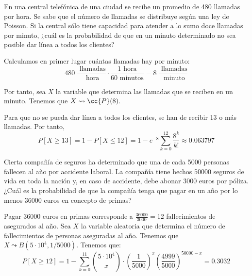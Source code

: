 \begin{ejercicio}
    En una central telefónica de una ciudad se recibe un promedio de 480 llamadas por hora. Se sabe que el número de llamadas se distribuye según una ley de Poisson. Si la central sólo tiene capacidad para atender a lo sumo doce llamadas por minuto, ¿cuál es la probabilidad de que en un minuto determinado no sea posible dar línea a todos los clientes?

    Calculamos en primer lugar cuántas llamadas hay por minuto:
    \begin{equation*}
        480 \;\frac{\text{ llamadas}}{\text{ hora}} \cdot \frac{1 \text{ hora}}{60 \text{ minutos}} = 8\;\frac{\text{ llamadas}}{\text{ minuto}}
    \end{equation*}

    Por tanto, sea $X$ la variable que determina las llamadas que se reciben en un minuto. Tenemos que $X\leadsto \cc{P}(8)$.

    Para que no se pueda dar línea a todos los clientes, se han de recibir 13 o más llamadas. Por tanto,
    \begin{equation*}
        P[X\geq 13] = 1-P[X\leq 12] = 1-e^{-8}\sum_{k=0}^{12} \frac{8^k}{k!} \approx 0.063797
    \end{equation*}
\end{ejercicio}

\begin{ejercicio}
    Cierta compañía de seguros ha determinado que una de cada 5000 personas fallecen al año por accidente laboral. La compañía tiene hechos 50000 seguros de vida en toda la nación y, en caso de accidente, debe abonar 3000 euros por póliza. ¿Cuál es la probabilidad de que la compañía tenga que pagar en un año por lo menos 36000 euros en concepto de primas?

    Pagar 36000 euros en primas corresponde a $\frac{36000}{3000}=12$ fallecimientos de asegurados al año. Sea $X$ la variable aleatoria que determina el número de fallecimientos de personas aseguradas al año. Tenemos que $X\leadsto B(5\cdot 10^4, 1/5000)$. Tenemos que:
    \begin{equation*}
        P[X\geq 12]=1-\sum_{k=0}^{11} \binom{5\cdot 10^4}{x}\cdot \left(\frac{1}{5000}\right)^{x} \left(\frac{4999}{5000}\right)^{50000-x}=0.3032
    \end{equation*}
\end{ejercicio}


